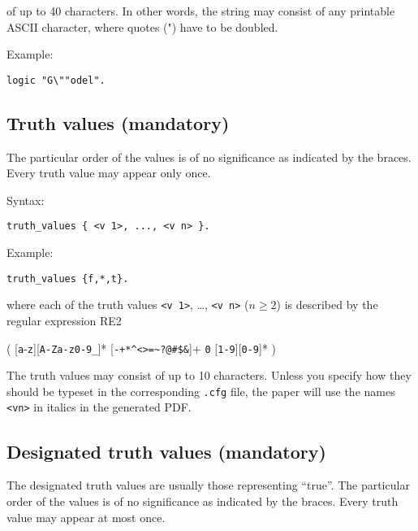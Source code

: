 \documentclass[]{article}
\begin{document}
of up to 40 characters. In other words, the string may consist of any
printable ASCII character, where quotes (") have to be doubled.

Example:

\begin{verbatim}
logic "G\""odel".
\end{verbatim}

\hypertarget{truth-values-mandatory}{%
\subsection{Truth values (mandatory)}\label{truth-values-mandatory}}

The particular order of the values is of no significance as indicated by
the braces. Every truth value may appear only once.

Syntax:

\begin{verbatim}
truth_values { <v 1>, ..., <v n> }.
\end{verbatim}

Example:

\begin{verbatim}
truth_values {f,*,t}.
\end{verbatim}

where each of the truth values \texttt{\textless{}v\ 1\textgreater{}},
\ldots{}, \texttt{\textless{}v\ n\textgreater{}} (\(n \ge 2\)) is
described by the regular expression RE2

( {[}\texttt{a}-\texttt{z}{]}{[}\texttt{A-Za-z0-9\_}{]}* \textbar{}
{[}\texttt{-+*\^{}\textless{}\textgreater{}=\textasciitilde{}?@\#\$\&}{]}+
\textbar{} \texttt{0} \textbar{} {[}\texttt{1-9}{]}{[}\texttt{0-9}{]}* )

The truth values may consist of up to 10 characters. Unless you specify
how they should be typeset in the corresponding \texttt{.cfg} file, the
paper will use the names \texttt{\textless{}vn\textgreater{}} in italics
in the generated PDF.

\hypertarget{designated-truth-values-mandatory}{%
\subsection{Designated truth values
(mandatory)}\label{designated-truth-values-mandatory}}

The designated truth values are usually those representing ``true''. The
particular order of the values is of no significance as indicated by the
braces. Every truth value may appear at most once.
\end{document}
